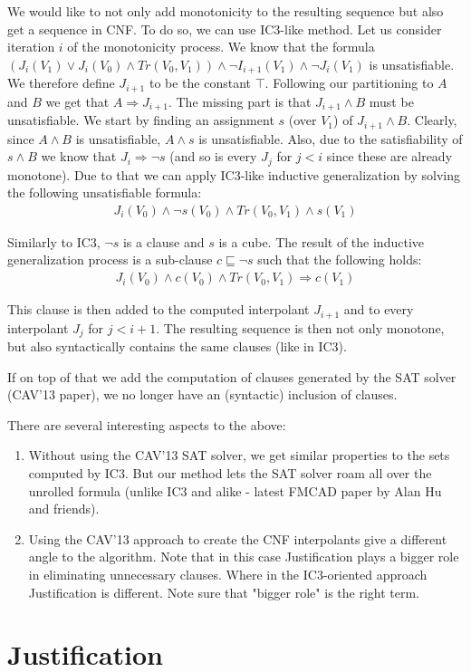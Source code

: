 \documentclass{article}
\newcommand{\Tr}{\mathit{Tr}}
\newcommand{\true}{\top}
\begin{document}
We would like to not only add monotonicity to the resulting sequence but also get a sequence in CNF. To do so, we can use IC3-like method. Let us consider iteration $i$ of the monotonicity process. We know that the formula $(J_i(V_1) \lor J_i(V_0) \land \Tr(V_0,V_1)) \land \neg I_{i+1}(V_1) \land \neg J_i(V_1)$ is unsatisfiable. We therefore define $J_{i+1}$ to be the constant $\true$. Following our partitioning to $A$ and $B$ we get that $A\Rightarrow J_{i+1}$. The missing part is that $J_{i+1}\land B$ must be unsatisfiable. We start by finding an assignment $s$ (over $V_1$) of $J_{i+1}\land B$. Clearly, since $A\land B$ is unsatisfiable, $A\land s$ is unsatisfiable. Also, due to the satisfiability of $s\land B$ we know that $J_i\Rightarrow\neg s$ (and so is every $J_j$ for $j < i$ since these are already monotone). Due to that we can apply IC3-like inductive generalization by solving the following unsatisfiable formula:
\begin{align}
  J_i(V_0)\land\neg s(V_0) \land \Tr(V_0,V_1)\land s(V_1)
\end{align}

Similarly to IC3, $\neg s$ is a clause and $s$ is a cube. The result of the inductive generalization process is a sub-clause $c\sqsubseteq \neg s$ such that the following holds:
\begin{align}
  J_i(V_0)\land c(V_0) \land \Tr(V_0,V_1)\Rightarrow c(V_1)
\end{align}

This clause is then added to the computed interpolant $J_{i+1}$ and to every interpolant $J_j$ for $j < i+1$. The resulting sequence is then not only monotone, but also syntactically contains the same clauses (like in IC3).

If on top of that we add the computation of clauses generated by the SAT solver (CAV'13 paper), we no longer have an (syntactic) inclusion of clauses.

There are several interesting aspects to the above:
\begin{enumerate}
	\item Without using the CAV'13 SAT solver, we get similar properties to the sets computed by IC3. But our method lets the SAT solver roam all over the unrolled formula (unlike IC3 and alike - latest FMCAD paper by Alan Hu and friends).
	\item Using the CAV'13 approach to create the CNF interpolants give a different angle to the algorithm. Note that in this case Justification plays a bigger role in eliminating unnecessary clauses. Where in the IC3-oriented approach Justification is different. Note sure that "bigger role" is the right term.
\end{enumerate}


\section{Justification}
\end{document}

